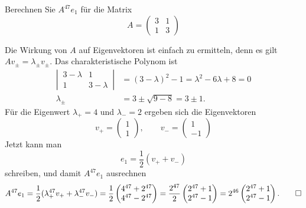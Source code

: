 Berechnen Sie $A^{47}e_1$ für die Matrix
\[
A=\begin{pmatrix}
3&1\\
1&3
\end{pmatrix}
\]


\begin{loesung}
Die Wirkung von $A$ auf Eigenvektoren ist einfach zu ermitteln,
denn es gilt $Av_{\pm}=\lambda_{\pm}v_{\pm}$.
Das charakteristische Polynom ist
\begin{align*}
\left|\,\begin{matrix}3-\lambda&1\\1&3-\lambda\end{matrix}\,\right|
&=
(3-\lambda)^2-1=\lambda^2-6\lambda+8=0
\\
\lambda_{\pm}&=3\pm\sqrt{9-8}=3\pm1.
\end{align*}
Für die Eigenwert $\lambda_+=4$ und $\lambda_-=2$ ergeben sich die
Eigenvektoren
\[
v_+=\begin{pmatrix}1\\1\end{pmatrix},\qquad
v_-=\begin{pmatrix}1\\-1\end{pmatrix}
\]
Jetzt kann man
\[
e_1=\frac12(v_++v_-)
\]
schreiben, und damit $A^{47}e_1$ ausrechnen
\[
A^{47}e_1=\frac12( \lambda_+^{47}v_++\lambda_-^{47}v_-)
=\frac12\begin{pmatrix}
4^{47}+2^{47}\\
4^{47}-2^{47}
\end{pmatrix}
=\frac{2^{47}}2\begin{pmatrix}
2^{47}+1\\
2^{47}-1
\end{pmatrix}
=2^{46}\begin{pmatrix}
2^{47}+1\\
2^{47}-1
\end{pmatrix}.
\qedhere
\]
\end{loesung}

